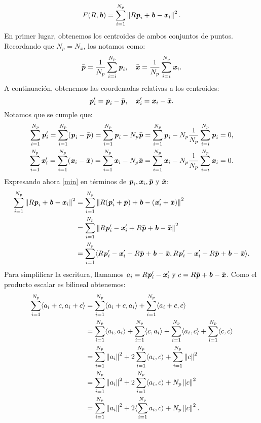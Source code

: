 		\begin{equation}\label{min}
		F (R,\textbf{\emph{b}}) = \sum_{i = 1}^{N_p} \left\Vert R\textbf{\emph{p}}_i + \textbf{\emph{b}} - \textbf{\emph{x}}_i\right\Vert^2.
		\end{equation}
		En primer lugar, obtenemos los centroides de ambos conjuntos de puntos. Recordando que $ N_p = N_x $, los notamos como:
		\[
		\bar{\textbf{\emph{p}}} = \frac{1}{N_p} \sum_{i=i}^{N_p} \textbf{\emph{p}}_i,  \quad \bar{\textbf{\emph{x}}} = \frac{1}{N_p} \sum_{i=i}^{N_p} \textbf{\emph{x}}_i.
		\]
		A continuación, obtenemos las coordenadas relativas a los centroides:
		\[
		\textbf{\emph{p}}_i' = \textbf{\emph{p}}_i - \bar{\textbf{\emph{p}}}, \quad \textbf{\emph{x}}_i' = \textbf{\emph{x}}_i - \bar{\textbf{\emph{x}}}.
		\]
		Notamos que se cumple que:
		\begin{equation}\label{cen0}
		\begin{split}
			\sum_{i=1}^{N_p} \textbf{\emph{p}}_i' = \sum_{i=1}^{N_p} (\textbf{\emph{p}}_i - \bar{\textbf{\emph{p}}}) = \sum_{i=1}^{N_p} \textbf{\emph{p}}_i - N_p\bar{\textbf{\emph{p}}} = \sum_{i=1}^{N_p} \textbf{\emph{p}}_i - N_p\frac{1}{N_p} \sum_{i=i}^{N_p} \textbf{\emph{p}}_i = 0, \\
			\sum_{i=1}^{N_p} \textbf{\emph{x}}_i' = \sum_{i=1}^{N_p} (\textbf{\emph{x}}_i - \bar{\textbf{\emph{x}}}) = \sum_{i=1}^{N_p} \textbf{\emph{x}}_i - N_p\bar{\textbf{\emph{x}}} = \sum_{i=1}^{N_p} \textbf{\emph{x}}_i - N_p\frac{1}{N_p} \sum_{i=i}^{N_p} \textbf{\emph{x}} _i = 0. 
		\end{split}
		\end{equation}		
		Expresando ahora \eqref{min} en términos de $ \textbf{\emph{p}}_i, \textbf{\emph{x}}_i, \bar{\textbf{\emph{p}}} \text{ y } \bar{\textbf{\emph{x}}}$:
		\begin{equation*}
		\begin{split}
		\sum_{i = 1}^{N_p} \left\Vert R\textbf{\emph{p}}_i + \textbf{\emph{b}} - \textbf{\emph{x}}_i\right\Vert^2 &= \sum_{i = 1}^{N_p} \left\Vert R(\textbf{\emph{p}}_i' + \bar{\textbf{\emph{p}}} ) + \textbf{\emph{b}} - (\textbf{\emph{x}}_i' + \bar{\textbf{\emph{x}}})\right\Vert^2 \\
		&=\sum_{i = 1}^{N_p} \left\Vert R\textbf{\emph{p}}_i' -\textbf{\emph{x}}_i' + R\bar{\textbf{\emph{p}}}  + \textbf{\emph{b}} - \bar{\textbf{\emph{x}}}\right\Vert^2 \\
		&= \sum_{i = 1}^{N_p} \langle R\textbf{\emph{p}}_i' -\textbf{\emph{x}}_i' + R\bar{\textbf{\emph{p}}}  + \textbf{\emph{b}} - \bar{\textbf{\emph{x}}}, R\textbf{\emph{p}}_i' -\textbf{\emph{x}}_i' + R\bar{\textbf{\emph{p}}}  + \textbf{\emph{b}} - \bar{\textbf{\emph{x}}} \rangle.
		\end{split}
		\end{equation*} 
		Para simplificar la escritura, llamamos $ a_i = R\textbf{\emph{p}}_i' -\textbf{\emph{x}}_i' \text{ y } c = R\bar{\textbf{\emph{p}}}  + \textbf{\emph{b}} - \bar{\textbf{\emph{x}}}$. Como el producto escalar es bilineal obtenemos: 
		\begin{equation*}
		\begin{split}
		\sum_{i = 1}^{N_p} \langle a_i + c, a_i + c\rangle &= \sum_{i = 1}^{N_p} \langle a_i + c, a_i \rangle + \sum_{i = 1}^{N_p} \langle a_i + c, c\rangle\\ 
		& = \sum_{i = 1}^{N_p} \langle a_i, a_i \rangle + \sum_{i = 1}^{N_p} \langle c, a_i\rangle + \sum_{i = 1}^{N_p} \langle a_i, c \rangle + \sum_{i = 1}^{N_p} \langle c, c\rangle \\
		& = \sum_{i = 1}^{N_p} \left\Vert a_i\right\Vert^2 + 2\sum_{i = 1}^{N_p} \langle a_i, c\rangle + \sum_{i = 1}^{N_p} \left\Vert c\right\Vert^2 \\
		& = \sum_{i = 1}^{N_p} \left\Vert a_i\right\Vert^2 + 2\sum_{i = 1}^{N_p} \langle a_i, c\rangle + N_p \left\Vert c\right\Vert^2 \\
		& = \sum_{i = 1}^{N_p} \left\Vert a_i\right\Vert^2 + 2 \langle \sum_{i = 1}^{N_p} a_i, c\rangle + N_p \left\Vert c\right\Vert^2.
		\end{split}
		\end{equation*} 

